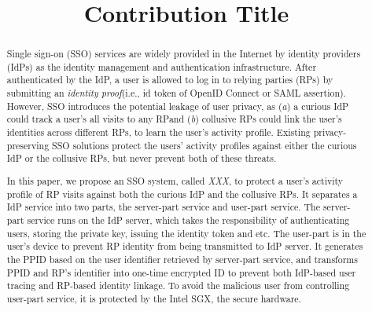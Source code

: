 \documentclass[runningheads]{llncs}
\begin{document}
%
\title{Contribution Title}%
%
%
\author{}
\institute{}
\begin{comment}
\author{First Author\inst{1}\orcidID{0000-1111-2222-3333} \and
Second Author\inst{2,3}\orcidID{1111-2222-3333-4444} \and
Third Author\inst{3}\orcidID{2222--3333-4444-5555}}
%
\authorrunning{F. Author et al.}
%
\institute{Princeton University, Princeton NJ 08544, USA \and
Springer Heidelberg, Tiergartenstr. 17, 69121 Heidelberg, Germany
\email{lncs@springer.com}\\
\url{http://www.springer.com/gp/computer-science/lncs} \and
ABC Institute, Rupert-Karls-University Heidelberg, Heidelberg, Germany\\
\email{\{abc,lncs\}@uni-heidelberg.de}}
\end{comment}
%
\maketitle              %
%
\begin{abstract}
Single sign-on (SSO) services are widely provided in the Internet by identity providers (IdPs) as the identity management and authentication infrastructure.
After authenticated by the IdP, a user is allowed to log in to relying parties (RPs) by submitting an \emph{identity proof}(i.e., id token of OpenID Connect or SAML assertion).
However, SSO introduces the potential leakage of user privacy, as (\emph{a}) a curious IdP could track a user's all visits to any RPand (\emph{b}) collusive RPs could link the user's identities across different RPs, to learn the user's activity profile.
Existing privacy-preserving SSO solutions protect the users' activity profiles against either the curious IdP or the collusive RPs, but never prevent both of these threats.

In this paper, we propose an SSO system, called \emph{XXX}, to protect a user's activity profile of RP visits against both the curious IdP and the collusive RPs.
It separates a IdP service into two parts, the server-part service and user-part service. The server-part service runs on the IdP server, which takes the responsibility of authenticating users, storing the private key, issuing the identity token and etc. The user-part is in the user's device to prevent RP identity from being transmitted to IdP server. It generates the PPID based on the user identifier retrieved by server-part service, and transforms PPID and RP's identifier into one-time encrypted ID to prevent both IdP-based user tracing and RP-based identity linkage. To avoid the malicious user from controlling user-part service, it is protected by the Intel SGX, the secure hardware.

\end{abstract}
%
%
%
\end{document}
